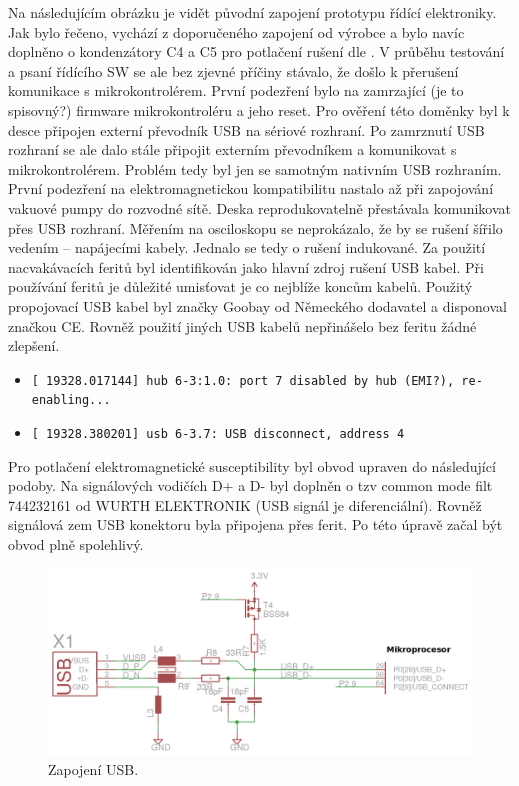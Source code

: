 Na následujícím obrázku je vidět původní zapojení prototypu řídící elektroniky. Jak bylo řečeno, vychází z doporučeného zapojení od výrobce a bylo navíc doplněno o kondenzátory C4 a C5 pro potlačení rušení dle \cite{intel}. V průběhu testování a psaní řídícího SW se ale bez zjevné příčiny stávalo, že došlo k přerušení komunikace s mikrokontrolérem. První podezření bylo na zamrzající (je to spisovný?) firmware mikrokontroléru a jeho reset. Pro ověření této doměnky byl k desce připojen externí převodník USB na sériové rozhraní. Po zamrznutí USB rozhraní se ale dalo stále připojit externím převodníkem a komunikovat s mikrokontrolérem. Problém tedy byl jen se samotným nativním USB rozhraním. 
První podezření na elektromagnetickou kompatibilitu nastalo až při zapojování vakuové pumpy do rozvodné sítě. Deska reprodukovatelně přestávala komunikovat přes USB rozhraní. Měřením na osciloskopu se neprokázalo, že by se rušení šířilo vedením – napájecími kabely. 
Jednalo se tedy o rušení indukované. Za použití nacvakávacích feritů byl identifikován jako hlavní zdroj rušení USB kabel. Při používání feritů je důležité umisťovat je co nejblíže koncům kabelů.
Použitý propojovací USB kabel byl značky Goobay od Německého dodavatel a disponoval značkou CE. Rovněž použití jiných USB kabelů nepřinášelo bez feritu žádné zlepšení. 

\begin{itemize}
\item \verb|[ 19328.017144] hub 6-3:1.0: port 7 disabled by hub (EMI?), re-enabling...|
\item \verb|[ 19328.380201] usb 6-3.7: USB disconnect, address 4|
\end{itemize}





Pro potlačení elektromagnetické susceptibility byl obvod upraven do následující podoby.
Na signálových vodičích D+ a D- byl doplněn o tzv common mode filt 744232161 od WURTH ELEKTRONIK (USB signál je diferenciální). Rovněž signálová zem USB konektoru byla připojena přes ferit. Po této úpravě začal být obvod plně spolehlivý.

\begin{figure}[h!]

  \centering
    \includegraphics[width=0.8\linewidth]{obrazky/usbEMI.png}%
    \caption{Zapojení USB.}
\end{figure}

